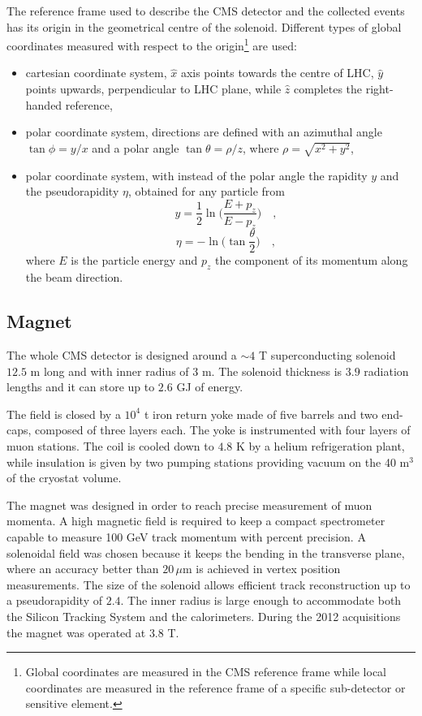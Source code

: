 The reference frame used to describe the CMS detector and the collected events
has its origin in the geometrical centre of the solenoid. Different
types of global coordinates measured with respect to the origin\footnote{Global coordinates are measured in the CMS reference frame while local coordinates are measured in the reference frame of a specific sub-detector or sensitive element.} are used:
\begin{itemize}
\item cartesian coordinate system, $\hat{x}$ axis points towards the centre of LHC,
$\hat{y}$ points upwards, perpendicular to LHC plane, while $\hat{z}$ completes the
right-handed reference,
\item polar coordinate system, directions are defined with an azimuthal angle
$\tan\phi=y/x$ and a polar angle $\tan\theta=\rho/z$, where $\rho=\sqrt{x^2+y^2}$,
\item polar coordinate system, with instead of the polar angle the rapidity $y$ and the pseudorapidity $\eta$, obtained for any particle from
\begin{displaymath}\quad
y=\frac{1}{2}\ln\Bigg(\frac{E+p_z}{E-p_z}\Bigg) \quad,
\end{displaymath}
\begin{displaymath}\quad
\eta=-\ln\bigg(\tan\frac{\theta}{2}\bigg) \quad,
\end{displaymath}
where $E$ is the particle energy and $p_z$ the component of its momentum along the
beam direction.
\end{itemize}

\subsection{Magnet}
The whole CMS detector is designed around a $\sim4$ T superconducting solenoid \cite{mag}
$12.5$ m long and with inner radius of 3 m. The solenoid thickness is $3.9$ radiation
lengths and it can store up to $2.6$ GJ of energy.

The field is closed by a $10^4$ t iron return yoke made of five barrels and two
end-caps, composed of three layers each. The yoke is instrumented with four layers
of muon stations. The coil is cooled down to $4.8$ K by a helium refrigeration plant,
while insulation is given by two pumping stations providing vacuum on the 40 m$^3$
of the cryostat volume.

The magnet was designed in order to reach precise measurement of muon momenta. 
A high magnetic field is required to keep a compact spectrometer capable
to measure 100 GeV track momentum with percent precision. A solenoidal field
was chosen because it keeps the bending in the transverse plane, where an accuracy
better than $20\,\mu\mathrm{m}$ is achieved in vertex position measurements. The size of the
solenoid allows efficient track reconstruction up to a pseudorapidity of $2.4$. The
inner radius is large enough to accommodate both the Silicon Tracking System
and the calorimeters. During the 2012 acquisitions the magnet was operated at $3.8$ T.

